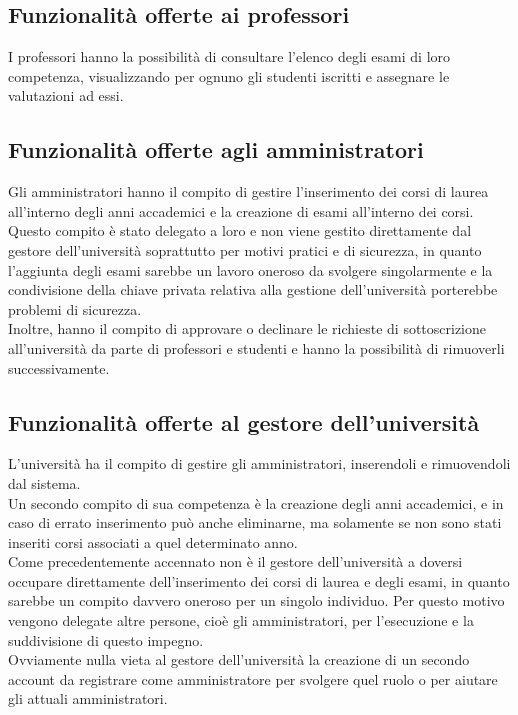 \documentclass[AnalisiDeiRequisiti.tex]{subfiles}
\begin{document}
\subsection{Funzionalità offerte ai professori}
I professori hanno la possibilità di consultare l'elenco degli esami di loro competenza, visualizzando per ognuno gli studenti iscritti e assegnare le valutazioni ad essi.

\subsection{Funzionalità offerte agli amministratori}
Gli amministratori hanno il compito di gestire l'inserimento dei corsi di laurea all'interno degli anni accademici e la creazione di esami all'interno dei corsi.\\
Questo compito è stato delegato a loro e non viene gestito direttamente dal gestore dell'università soprattutto per motivi pratici e di sicurezza, in quanto l'aggiunta degli esami sarebbe un lavoro oneroso da svolgere singolarmente e la condivisione della chiave privata relativa alla gestione dell'università porterebbe problemi di sicurezza.\\
Inoltre, hanno il compito di approvare o declinare le richieste di sottoscrizione all'università da parte di professori e studenti e hanno la possibilità di rimuoverli successivamente.


\subsection{Funzionalità offerte al gestore dell'università}
L'università ha il compito di gestire gli amministratori, inserendoli e rimuovendoli dal sistema.\\
Un secondo compito di sua competenza è la creazione degli anni accademici, e in caso di errato inserimento può anche eliminarne, ma solamente se non sono stati inseriti corsi associati a quel determinato anno.\\
Come precedentemente accennato non è il gestore dell'università a doversi occupare direttamente dell'inserimento dei corsi di laurea e degli esami, in quanto sarebbe un compito davvero oneroso per un singolo individuo. Per questo motivo vengono delegate altre persone, cioè gli amministratori, per l'esecuzione e la suddivisione di questo impegno.\\
Ovviamente nulla vieta al gestore dell'università la creazione di un secondo account da registrare come amministratore per svolgere quel ruolo o per aiutare gli attuali amministratori.
\end{document}

